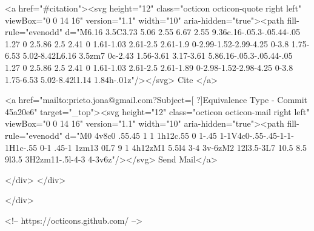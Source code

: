       <a  href="#citation"><svg height="12" class="octicon octicon-quote right left" viewBox="0 0 14 16" version="1.1" width="10" aria-hidden="true"><path fill-rule="evenodd" d="M6.16 3.5C3.73 5.06 2.55 6.67 2.55 9.36c.16-.05.3-.05.44-.05 1.27 0 2.5.86 2.5 2.41 0 1.61-1.03 2.61-2.5 2.61-1.9 0-2.99-1.52-2.99-4.25 0-3.8 1.75-6.53 5.02-8.42L6.16 3.5zm7 0c-2.43 1.56-3.61 3.17-3.61 5.86.16-.05.3-.05.44-.05 1.27 0 2.5.86 2.5 2.41 0 1.61-1.03 2.61-2.5 2.61-1.89 0-2.98-1.52-2.98-4.25 0-3.8 1.75-6.53 5.02-8.42l1.14 1.84h-.01z"/></svg> Cite
      </a>

      <a href="mailto:prieto.jona@gmail.com?Subject=[ ?]Equivalence Type - Commit 45a20e6" target="_top"><svg height="12" class="octicon octicon-mail right left" viewBox="0 0 14 16" version="1.1" width="10" aria-hidden="true"><path fill-rule="evenodd" d="M0 4v8c0 .55.45 1 1 1h12c.55 0 1-.45 1-1V4c0-.55-.45-1-1-1H1c-.55 0-1 .45-1 1zm13 0L7 9 1 4h12zM1 5.5l4 3-4 3v-6zM2 12l3.5-3L7 10.5 8.5 9l3.5 3H2zm11-.5l-4-3 4-3v6z"/></svg> Send Mail</a>

    </div>
  </div>

</div>

<!-- https://octicons.github.com/ -->





